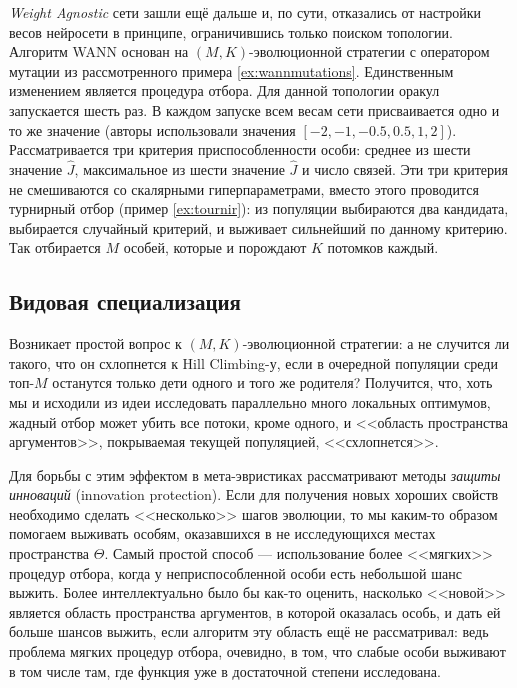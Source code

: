 \emph{Weight Agnostic} сети зашли ещё дальше и, по сути, отказались от настройки весов нейросети в принципе, ограничившись только поиском топологии. Алгоритм WANN основан на $(M, K)$-эволюционной стратегии с оператором мутации из рассмотренного примера \ref{ex:wannmutations}. Единственным изменением является процедура отбора. Для данной топологии оракул запускается шесть раз. В каждом запуске всем весам сети присваивается одно и то же значение (авторы использовали значения $[-2, -1, -0.5, 0.5, 1, 2]$). Рассматривается три критерия приспособленности особи: среднее из шести значение $\hat{J}$, максимальное из шести значение $\hat{J}$ и число связей. Эти три критерия не смешиваются со скалярными гиперпараметрами, вместо этого проводится турнирный отбор (пример \ref{ex:tournir}): из популяции выбираются два кандидата, выбирается случайный критерий, и выживает сильнейший по данному критерию. Так отбирается $M$ особей, которые и порождают $K$ потомков каждый.

\subsection{Видовая специализация}\label{specieisidea}

Возникает простой вопрос к $(M, K)$-эволюционной стратегии: а не случится ли такого, что он схлопнется к Hill Climbing-у, если в очередной популяции среди топ-$M$ останутся только дети одного и того же родителя? Получится, что, хоть мы и исходили из идеи исследовать параллельно много локальных оптимумов, жадный отбор может убить все потоки, кроме одного, и <<область пространства аргументов>>, покрываемая текущей популяцией, <<схлопнется>>.

Для борьбы с этим эффектом в мета-эвристиках рассматривают методы \emph{защиты инноваций} (innovation protection). Если для получения новых хороших свойств необходимо сделать <<несколько>> шагов эволюции, то мы каким-то образом помогаем выживать особям, оказавшихся в не исследующихся местах пространства $\Theta$. Самый простой способ --- использование более <<мягких>> процедур отбора, когда у неприспособленной особи есть небольшой шанс выжить. Более интеллектуально было бы как-то оценить, насколько <<новой>> является область пространства аргументов, в которой оказалась особь, и дать ей больше шансов выжить, если алгоритм эту область ещё не рассматривал: ведь проблема мягких процедур отбора, очевидно, в том, что слабые особи выживают в том числе там, где функция уже в достаточной степени исследована.

